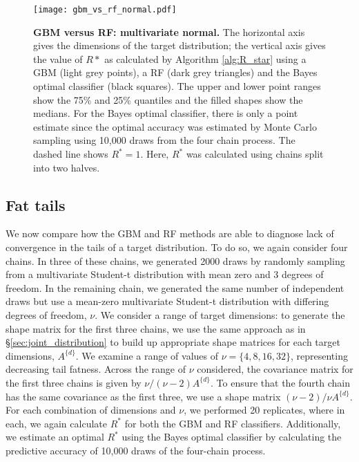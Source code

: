 \documentclass{article}
\begin{document}
\begin{figure}[!htb]
	\centerline{\texttt{[image: gbm\_vs\_rf\_normal.pdf]}}
	\caption{\textbf{GBM versus RF: multivariate normal.} The horizontal axis gives the dimensions of the target distribution; the vertical axis gives the value of $R*$ as calculated by Algorithm \ref{alg:R_star} using a GBM (light grey points), a RF (dark grey triangles) and the Bayes optimal classifier (black squares). The upper and lower point ranges show the 75\% and 25\% quantiles and the filled shapes show the medians. For the Bayes optimal classifier, there is only a point estimate since the optimal accuracy was estimated by Monte Carlo sampling using 10,000 draws from the four chain process. The dashed line shows $R^*=1$. Here, $R^*$ was calculated using chains split into two halves.}
	\label{fig:gbm_vs_rf_normal}
\end{figure}

\subsection{Fat tails}\label{sec:tail_fatness}
We now compare how the GBM and RF methods are able to diagnose lack of convergence in the tails of a target distribution. To do so, we again consider four chains. In three of these chains, we generated 2000 draws by randomly sampling from a multivariate Student-t distribution with mean zero and 3 degrees of freedom. In the remaining chain, we generated the same number of independent draws but use a mean-zero multivariate Student-t distribution with differing degrees of freedom, $\nu$. We consider a range of target dimensions: to generate the shape matrix for the first three chains, we use the same approach as in \S\ref{sec:joint_distribution} to build up appropriate shape matrices for each target dimensions, $A^{\{d\}}$. We examine a range of values of $\nu=\{4, 8, 16, 32\}$, representing decreasing tail fatness. Across the range of $\nu$ considered, the covariance matrix for the first three chains is given by $\nu/{(\nu-2)} A^{\{d\}}$. To ensure that the fourth chain has the same covariance as the first three, we use a shape matrix ${(\nu-2)}/\nu A^{\{d\}}$. For each combination of dimensions and $\nu$, we performed 20 replicates, where in each, we again calculate $R^*$ for both the GBM and RF classifiers. Additionally, we estimate an optimal $R^*$ using the Bayes optimal classifier by calculating the predictive accuracy of 10,000 draws of the four-chain process.
\end{document}
